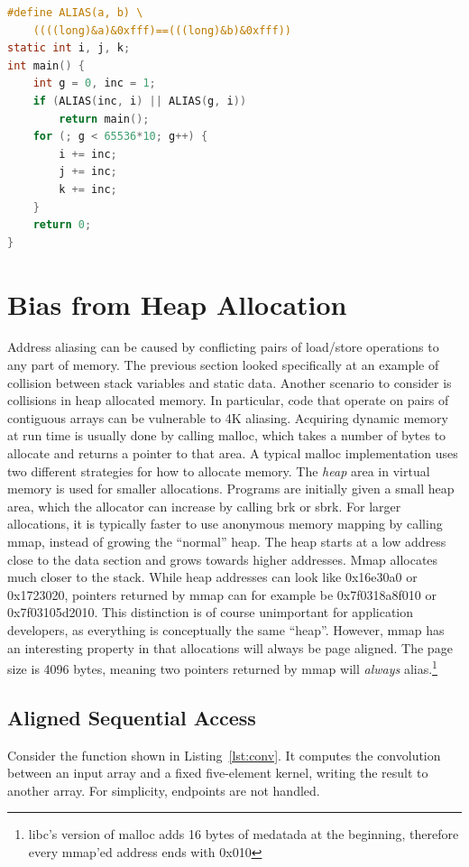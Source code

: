 \documentclass[a4paper,10pt,twocolumn,twoside]{article}
\begin{document}
\begin{lstlisting}[float=h, language=C, caption={Dynamically detect aliasing case, and avoid by pushing another stack frame.}, label={lst:loopkernel}, frame=lines]
#define ALIAS(a, b) \
    ((((long)&a)&0xfff)==(((long)&b)&0xfff))
static int i, j, k;
int main() {
    int g = 0, inc = 1;
    if (ALIAS(inc, i) || ALIAS(g, i))
        return main();
    for (; g < 65536*10; g++) {
        i += inc;
        j += inc;
        k += inc;
    }
    return 0;
}
\end{lstlisting}



\section{Bias from Heap Allocation}
Address aliasing can be caused by conflicting pairs of load/store operations to any part of memory.
The previous section looked specifically at an example of collision between stack variables and static data.
Another scenario to consider is collisions in heap allocated memory.
In particular, code that operate on pairs of contiguous arrays can be vulnerable to 4K aliasing.
Acquiring dynamic memory at run time is usually done by calling malloc, which takes a number of bytes to allocate and returns a pointer to that area.
A typical malloc implementation uses two different strategies for how to allocate memory.
The \emph{heap} area in virtual memory is used for smaller allocations.
Programs are initially given a small heap area, which the allocator can increase by calling brk or sbrk.
For larger allocations, it is typically faster to use anonymous memory mapping by calling mmap, instead of growing the ``normal'' heap.
The heap starts at a low address close to the data section and grows towards higher addresses. 
Mmap allocates much closer to the stack.
While heap addresses can look like 0x16e30a0 or 0x1723020, pointers returned by mmap can for example be 0x7f0318a8f010 or 0x7f03105d2010.
This distinction is of course unimportant for application developers, as everything is conceptually the same ``heap''.
However, mmap has an interesting property in that allocations will always be page aligned.
The page size is 4096 bytes, meaning two pointers returned by mmap will \emph{always} alias.\footnote{libc's version of malloc adds 16 bytes of medatada at the beginning, therefore every mmap'ed address ends with 0x010}

\subsection{Aligned Sequential Access}
Consider the function shown in Listing~\ref{lst:conv}.
It computes the convolution between an input array and a fixed five-element kernel, writing the result to another array.
For simplicity, endpoints are not handled.
\end{document}
